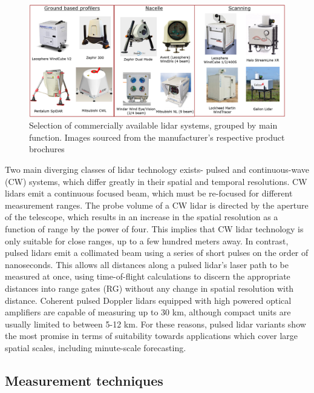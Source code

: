 \begin{figure}[htbp]
    \centering
        \includegraphics[width=1.0\textwidth]{graphics/intro/lidars.png}
    \caption{Selection of commercially available lidar systems, grouped by main function. Images sourced from the manufacturer's respective product brochures}
    \label{fig:lidars}
\end{figure}

Two main diverging classes of lidar technology exists- pulsed and continuous-wave (CW) systems, which differ greatly in their spatial and temporal resolutions. CW lidars emit a continuous focused beam, which must be re-focused for different measurement ranges. The probe volume of a CW lidar is directed by the aperture of the telescope, which results in an increase in the spatial resolution as a function of range by the power of four. This implies that CW lidar technology is only suitable for close ranges, up to a few hundred meters away. In contrast, pulsed lidars emit a collimated beam using a series of short pulses on the order of nanoseconds. This allows all distances along a pulsed lidar's laser path to be measured at once, using time-of-flight calculations to discern the appropriate distances into range gates (RG) without any change in spatial resolution with distance. Coherent pulsed Doppler lidars equipped with high powered optical amplifiers are capable of measuring up to 30 km, although compact units are usually limited to between 5-12 km. For these reasons, pulsed lidar variants show the most promise in terms of suitability towards applications which cover large spatial scales, including minute-scale forecasting.

\clearpage
\subsection{Measurement techniques}
\label{sec:intro_meas_tech}

